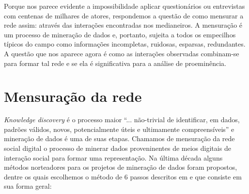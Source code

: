 \documentclass{article}
\begin{document}
Porque nos parece evidente a impossibilidade aplicar questionários ou entrevistas
com centenas de milhares de atores, respondemos a questão de como mensurar a rede
assim: através das interações encontradas nos medianeiros. A mensuração é um
processo de mineração de dados e, portanto, sujeita a todos os empecilhos típicos
do campo como informações incompletas, ruidosas, esparsas, redundantes. A questão
que nos aparece agora é como as interações observadas combinam-se para formar tal
rede e se ela é significativa para a análise de proeminência.

\section{Mensuração da rede}

\textit{Knowledge discovery} é o processo maior ``... não-trivial de identificar,
em dados, padrões válidos, novos, potencialmente úteis e ultimamente
compreensíveis'' \cite{Fayyad1996} e mineração de dados é uma de suas etapas.
Chamamos de mensuração da rede social digital o processo de minerar dados
proveninentes de meios digitais de interação social para formar uma
representação. Na última década alguns métodos norteadores para os projetos de
mineração de dados foram propostos, dentre os quais escolhemos o método de 6
passos descritos em \cite{Cios2005} e que consiste em sua forma geral:
\end{document}
